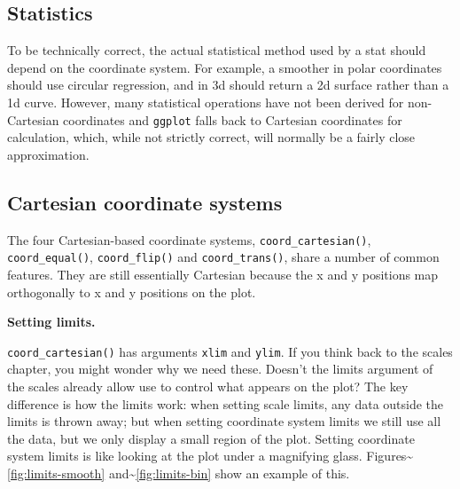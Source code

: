 \subsection{Statistics}\label{sub:statistics}

To be technically correct, the actual statistical method used by a stat
should depend on the coordinate system. For example, a smoother in polar
coordinates should use circular regression, and in 3d should return a 2d
surface rather than a 1d curve. However, many statistical operations
have not been derived for non-Cartesian coordinates and \texttt{ggplot}
falls back to Cartesian coordinates for calculation, which, while not
strictly correct, will normally be a fairly close approximation.

\subsection{Cartesian coordinate systems}\label{sub:cartesian}

The four Cartesian-based coordinate systems,
\texttt{coord\_cartesian()}, \texttt{coord\_equal()},
\texttt{coord\_flip()} and \texttt{coord\_trans()}, share a number of
common features. They are still essentially Cartesian because the x and
y positions map orthogonally to x and y positions on the plot.
 

\textbf{Setting limits.}

\texttt{coord\_cartesian()} has arguments \texttt{xlim} and
\texttt{ylim}. If you think back to the scales chapter, you might wonder
why we need these. Doesn't the limits argument of the scales already
allow use to control what appears on the plot? The key difference is how
the limits work: when setting scale limits, any data outside the limits
is thrown away; but when setting coordinate system limits we still use
all the data, but we only display a small region of the plot. Setting
coordinate system limits is like looking at the plot under a magnifying
glass. Figures\textasciitilde{}\ref{fig:limits-smooth}
and\textasciitilde{}\ref{fig:limits-bin} show an example of this.
 

\begin{Shaded}
\begin{Highlighting}[]
\StringTok{ }\StringTok{ }\NormalTok{())}
\StringTok{ }\NormalTok{(} \NormalTok{(}\NormalTok{, }\NormalTok{))}
\StringTok{ }\NormalTok{(} \NormalTok{(}\NormalTok{, }\NormalTok{))}
\end{Highlighting}
\end{Shaded}

